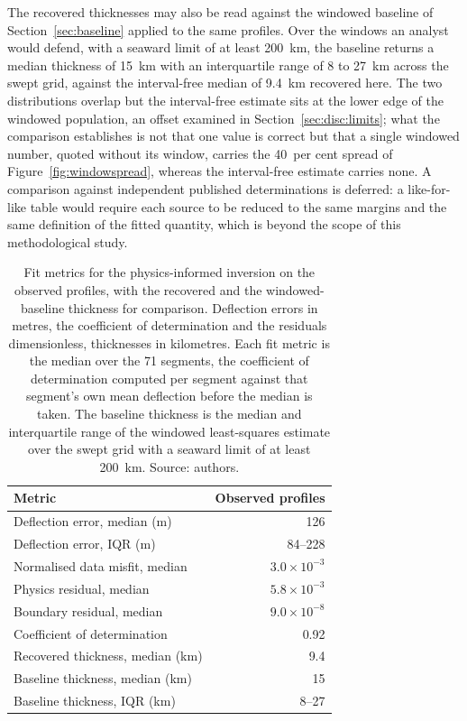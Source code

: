 \documentclass[final]{agujournal2019}
\begin{document}
The recovered thicknesses may also be read against the windowed baseline of
Section~\ref{sec:baseline} applied to the same profiles. Over the windows an
analyst would defend, with a seaward limit of at least 200~km, the baseline
returns a median thickness of 15~km with an interquartile range of 8 to 27~km
across the swept grid, against the interval-free median of 9.4~km recovered
here. The two distributions overlap but the interval-free estimate sits at the
lower edge of the windowed population, an offset examined in
Section~\ref{sec:disc:limits}; what the comparison establishes is not that one
value is correct but that a single windowed number, quoted without its window,
carries the 40~per cent spread of Figure~\ref{fig:windowspread}, whereas the
interval-free estimate carries none. A comparison against independent published
determinations is deferred: a like-for-like table would require each source to
be reduced to the same margins and the same definition of the fitted quantity,
which is beyond the scope of this methodological study.

\begin{table}\centering
  \caption{Fit metrics for the physics-informed inversion on the observed
  profiles, with the recovered and the windowed-baseline thickness for
  comparison. Deflection errors in metres, the coefficient of determination and
  the residuals dimensionless, thicknesses in kilometres. Each fit metric is
  the median over the 71 segments, the coefficient of determination computed per
  segment against that segment's own mean deflection before the median is taken.
  The baseline thickness is the median and interquartile range of the windowed
  least-squares estimate over the swept grid with a seaward limit of at least
  200~km. Source: authors.}
  \label{tab:metrics}
  \begin{tabular}{lr}
    \toprule
    Metric & Observed profiles \\
    \midrule
    Deflection error, median (m)      & 126 \\
    Deflection error, IQR (m)         & 84--228 \\
    Normalised data misfit, median    & $3.0\times10^{-3}$ \\
    Physics residual, median          & $5.8\times10^{-3}$ \\
    Boundary residual, median         & $9.0\times10^{-8}$ \\
    Coefficient of determination      & 0.92 \\
    \midrule
    Recovered thickness, median (km)  & 9.4 \\
    Baseline thickness, median (km)   & 15 \\
    Baseline thickness, IQR (km)      & 8--27 \\
    \bottomrule
  \end{tabular}
\end{table}
\end{document}
